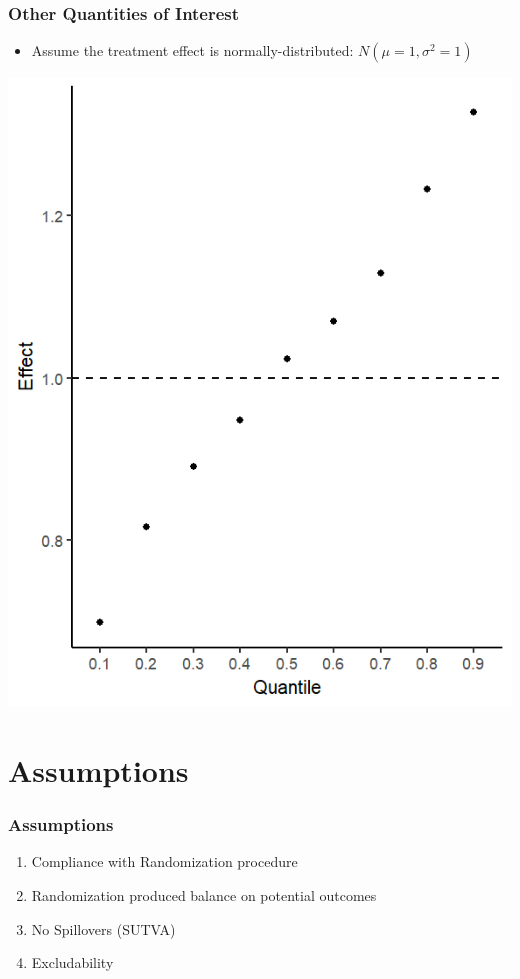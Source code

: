 \documentclass[xcolor=x11names,compress]{beamer}\usepackage[]{graphicx}\usepackage[]{color}
\makeatletter
\def\maxwidth{ %
  \ifdim\Gin@nat@width>\linewidth
    \linewidth
  \else
    \Gin@nat@width
  \fi
}
\newenvironment{knitrout}{}{} %
\renewcommand{\(}{\begin{columns}}
\renewcommand{\)}{\end{columns}}
\newcommand{\<}[1]{\begin{column}{#1}}
\renewcommand{\>}{\end{column}}
\makeatother
\begin{document}
\begin{frame}
\frametitle{Other Quantities of Interest}
\begin{multicols}{2}
\begin{itemize}
\item Assume the treatment effect is normally-distributed: $N(\mu=1,\sigma^2=1)$
\end{itemize}
\pause
\columnbreak
\begin{knitrout}
\color{fgcolor}
\includegraphics[width=\maxwidth]{figure/quant_reg-1} 

\end{knitrout}
\end{multicols}
\end{frame}



\section{Assumptions}

\begin{frame}
\frametitle{Assumptions}
\begin{enumerate}
\item Compliance with Randomization procedure
\pause
\item Randomization produced balance on potential outcomes
\pause
\item No Spillovers (SUTVA)
\pause
\item Excludability
\pause
\end{enumerate}
\end{frame}
\end{document}

